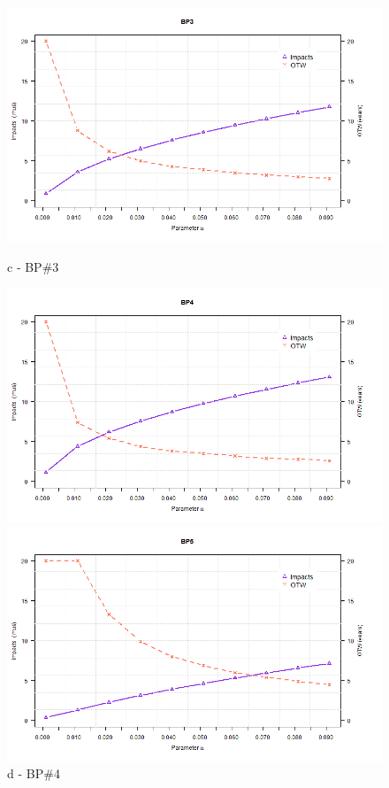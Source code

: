 \begin{figure}[!htb]
	\hspace{0.05cm}
	\begin{minipage}[b]{0.5\linewidth}
		\centering
		\includegraphics[width=\textwidth]{figures/ch05_fig_saalpha_pump3}
		\caption*{c - BP\#3}
	\end{minipage}
	\hspace{0.05cm}
	\begin{minipage}[b]{0.5\linewidth}
		\centering
		\includegraphics[width=\textwidth]{figures/ch05_fig_saalpha_pump4}
		\caption*{d - BP\#4}
	\end{minipage}
	\hspace{0.05cm}
	\begin{minipage}[b]{0.5\linewidth}
		\centering
		\includegraphics[width=\textwidth]{figures/ch05_fig_saalpha_pump5}

\end{minipage}
\end{figure}
